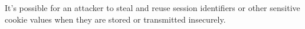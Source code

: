 It's possible for an attacker to steal and reuse
session identifiers or other sensitive cookie values
when they are stored or transmitted insecurely\cite{OWASP}.

